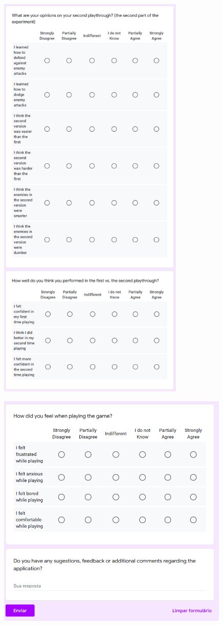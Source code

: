 \begin{figure}[!ht]
    \begin{center}
        \includegraphics[width=24em]{figures/fig-player-perception-survey-pt3.png}
    \end{center}
\end{figure}

\begin{figure}[!ht]
    \begin{center}
        \includegraphics[width=30em]{figures/fig-player-perception-survey-pt4.png}
    \end{center}
\end{figure}